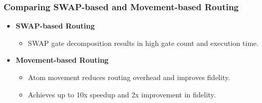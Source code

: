 \documentclass[18 pt]{beamer}
\begin{document}

\begin{frame}
    \frametitle{Comparing SWAP-based and Movement-based Routing}
    \begin{itemize}
        \item \textbf{SWAP-based Routing}
        \begin{itemize}
            \item SWAP gate decomposition results in high gate count and execution time.
        \end{itemize}
        \item \textbf{Movement-based Routing}
        \begin{itemize}
            \item Atom movement reduces routing overhead and improves fidelity.
            \item Achieves up to 10x speedup and 2x improvement in fidelity.
        \end{itemize}
    \end{itemize}
\end{frame}
\end{document}
